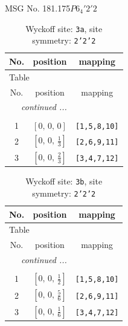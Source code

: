 \documentclass[fleqn,8pt]{jsarticle}
\begin{document}
\setcounter{MaxMatrixCols}{32}

\renewcommand{\tablename}{Table~}
\renewcommand{\figurename}{Figure~}
\begin{center}
\LARGE
MSG No. 181.175\quad$P6_{4}'2'2$
\end{center}
\renewcommand{\arraystretch}{1.2}
\begin{longtable}{ccc}
\caption{Wyckoff site: {\tt 3a}, site symmetry: {\tt 2'2'2}}
 \\
 \hline \hline
No. & position & mapping \\ \hline \endfirsthead

\multicolumn{2}{l}{\tablename\ \thetable{}} \\
 \hline \hline
No. & position & mapping \\ \hline \endhead

 \hline \hline
\multicolumn{2}{r}{\footnotesize\it continued ...} \\ \endfoot

 \hline \hline
\multicolumn{2}{r}{} \\ \endlastfoot

1 & $\left[ 0,\, 0,\, 0 \right]$ & {\tt [1,5,8,10]} \\ \hline
2 & $\left[ 0,\, 0,\, \frac{1}{3} \right]$ & {\tt [2,6,9,11]} \\ \hline
3 & $\left[ 0,\, 0,\, \frac{2}{3} \right]$ & {\tt [3,4,7,12]} \\
\end{longtable}
\renewcommand{\arraystretch}{1.2}
\begin{longtable}{ccc}
\caption{Wyckoff site: {\tt 3b}, site symmetry: {\tt 2'2'2}}
 \\
 \hline \hline
No. & position & mapping \\ \hline \endfirsthead

\multicolumn{2}{l}{\tablename\ \thetable{}} \\
 \hline \hline
No. & position & mapping \\ \hline \endhead

 \hline \hline
\multicolumn{2}{r}{\footnotesize\it continued ...} \\ \endfoot

 \hline \hline
\multicolumn{2}{r}{} \\ \endlastfoot

1 & $\left[ 0,\, 0,\, \frac{1}{2} \right]$ & {\tt [1,5,8,10]} \\ \hline
2 & $\left[ 0,\, 0,\, \frac{5}{6} \right]$ & {\tt [2,6,9,11]} \\ \hline
3 & $\left[ 0,\, 0,\, \frac{1}{6} \right]$ & {\tt [3,4,7,12]} \\
\end{longtable}
\end{document}
